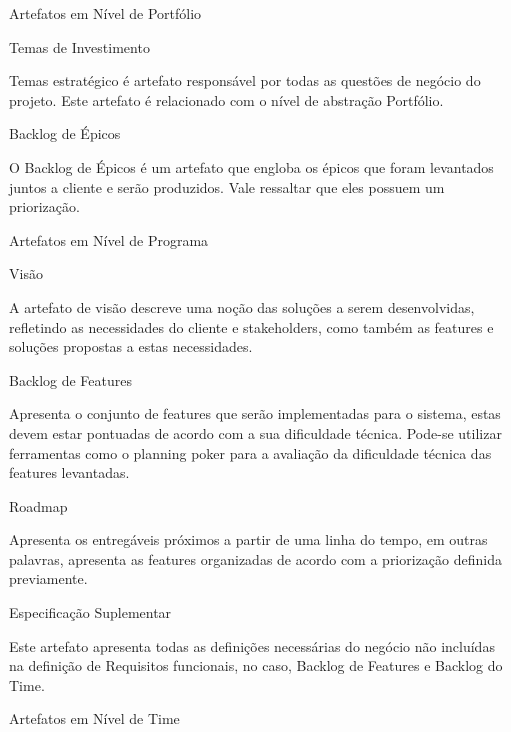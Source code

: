 {{\large{Artefatos em Nível de Portfólio \\}}

{
	\large{Temas de Investimento \\}

	\tab Temas estratégico é artefato responsável por todas as questões de negócio do projeto. Este artefato é relacionado com o nível de abstração Portfólio. \\
}


{
	\large{Backlog de  Épicos \\}

	\tab O Backlog de Épicos é um artefato que engloba os épicos que foram levantados juntos a cliente e serão produzidos. Vale ressaltar que eles possuem um priorização. \\
}

{\large{Artefatos em Nível de Programa \\}}

{
	\large{Visão \\}

	\tab A artefato de visão descreve uma noção das soluções a serem desenvolvidas, refletindo as necessidades do cliente e stakeholders, como também as features e soluções propostas a estas necessidades. \\
}


{
	\large{Backlog de Features \\}

	\tab Apresenta o conjunto de features que serão implementadas para o sistema, estas devem estar pontuadas de acordo com a sua dificuldade técnica. Pode-se utilizar ferramentas como o planning poker para a avaliação da dificuldade técnica das features levantadas. \\
}

{
	\large{Roadmap \\}

	\tab Apresenta os entregáveis próximos a partir de uma linha do tempo, em outras palavras, apresenta as features organizadas de acordo com a priorização definida previamente. \\
}

{
	\large{Especificação Suplementar\\}

	\tab Este artefato apresenta todas as definições necessárias do negócio não incluídas na definição de Requisitos funcionais, no caso, Backlog de Features e Backlog do Time. \\
}

{\large{Artefatos em Nível de Time \\}}

}
